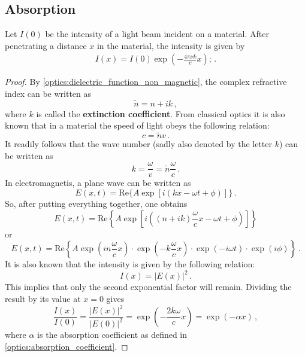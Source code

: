 \subsection{Absorption}

    \begin{theorem}\label{optics:lambert_beer}
        Let $I(0)$ be the intensity of a light beam incident on a material. After penetrating a distance $x$ in the material, the intensity is given by
        \begin{gather}
            I(x) = I(0)\exp\left(-\frac{4\pi\nu k}{c}x\right);\,.
        \end{gather}
        \begin{mdframed}[roundcorner=10pt, linecolor=blue, linewidth=1pt]
            \begin{proof}
                By \cref{optics:dielectric_function_non_magnetic}, the complex refractive index can be written as \[\widetilde{n} = n+ik\,,\] where $k$ is called the \textbf{extinction coefficient}. From classical optics it is also known that in a material the speed of light obeys the following relation: \[c = \widetilde{n}v\,.\] It readily follows that the wave number (sadly also denoted by the letter $k$) can be written as \[k = \frac{\omega}{v} = \widetilde{n}\frac{\omega}{c}\,.\] In electromagnetis, a plane wave can be written as \[E(x,t) = \mathrm{Re}\bigl\{A\exp\left[i(kx - \omega t + \phi)\right]\bigr\}\,.\] So, after putting everything together, one obtains \[E(x,t) = \mathrm{Re}\left\{A\exp\left[i\left((n+ik)\frac{\omega}{c}x - \omega t + \phi\right)\right]\right\}\] or \[E(x,t) = \mathrm{Re}\left\{A\exp\left(in\frac{\omega}{c}x\right)\cdot\exp\left(-k\frac{\omega}{c}x\right)\cdot\exp\left(-i\omega t\right)\cdot\exp\left(i\phi\right)\right\}\,.\] It is also known that the intensity is given by the following relation:\[I(x) = |E(x)|^2\,.\] This implies that only the second exponential factor will remain. Dividing the result by its value at $x=0$ gives \[\frac{I(x)}{I(0)} = \frac{|E(x)|^2}{|E(0)|^2} = \exp\left(-\frac{2k\omega}{c}x\right) = \exp(-\alpha x)\,,\]
                where $\alpha$ is the absorption coefficient as defined in \cref{optics:absorption_coefficient}.
            \end{proof}
        \end{mdframed}
    \end{theorem}


